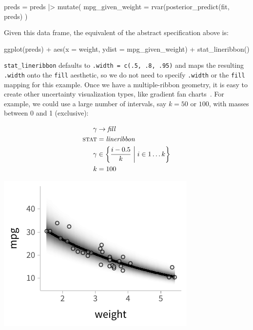 \documentclass[journal]{vgtc}              %
\newenvironment{centerverbatim}{%
  \hfill\break
  \small
  \centering
  \varwidth{\linewidth}%
  \verbatim
}{%
  \endverbatim
  \endvarwidth
  \par
  \hfill\break
}
\begin{document}
\begin{centerverbatim}
preds = preds |> mutate(
  mpg_given_weight = rvar(posterior_predict(fit, preds)
)
\end{centerverbatim}

Given this data frame, the equivalent of the abstract specification above is:

\begin{centerverbatim}
ggplot(preds) +
  aes(x = weight, ydist = mpg_given_weight) +
  stat_lineribbon()
\end{centerverbatim}

\texttt{stat\_lineribbon} defaults to \texttt{.width = c(.5, .8, .95)} and maps the resulting \texttt{.width} onto the \texttt{fill} aesthetic, so we do not need to specify \texttt{.width} or the \texttt{fill} mapping for this example. Once we have a multiple-ribbon geometry, it is easy to create other uncertainty visualization types, like gradient fan charts~\cite{bowman2019graphics,jackson2008displaying}. For example, we could use a large number of intervals, say $k = 50$ or $100$, with masses between 0 and 1 (exclusive):

\noindent
\begin{minipage}{.5\columnwidth}

\begin{align*}
\gamma &\rightarrow \mathit{fill}\\
\textsc{stat} &= \mathit{lineribbon}\\
\gamma &\in \left\{\frac{i - 0.5}{k} \mathrel{}\middle|\mathrel{} i \in 1 \dots k \right\}\\
k &= 100
\end{align*}
\end{minipage}%
  \begin{minipage}{.4\columnwidth}
    \centering
    \includegraphics[width=1.2\columnwidth]{figs/3-lineribbon_fan.pdf}
  \end{minipage}
\hfill\break
\end{document}
